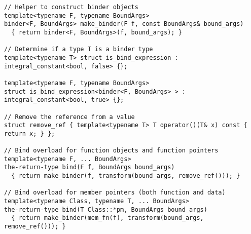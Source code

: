 \documentclass{article}
\begin{document}
\begin{verbatim}
// Helper to construct binder objects
template<typename F, typename BoundArgs>
binder<F, BoundArgs> make_binder(F f, const BoundArgs& bound_args)
  { return binder<F, BoundArgs>(f, bound_args); }

// Determine if a type T is a binder type
template<typename T> struct is_bind_expression : integral_constant<bool, false> {};

template<typename F, typename BoundArgs>
struct is_bind_expression<binder<F, BoundArgs> > : integral_constant<bool, true> {};

// Remove the reference from a value
struct remove_ref { template<typename T> T operator()(T& x) const { return x; } };

// Bind overload for function objects and function pointers
template<typename F, ... BoundArgs>
the-return-type bind(F f, BoundArgs bound_args)
  { return make_binder(f, transform(bound_args, remove_ref())); }

// Bind overload for member pointers (both function and data)
template<typename Class, typename T, ... BoundArgs>
the-return-type bind(T Class::*pm, BoundArgs bound_args)
  { return make_binder(mem_fn(f), transform(bound_args, remove_ref())); }
\end{verbatim}
\normalsize



\end{document}
